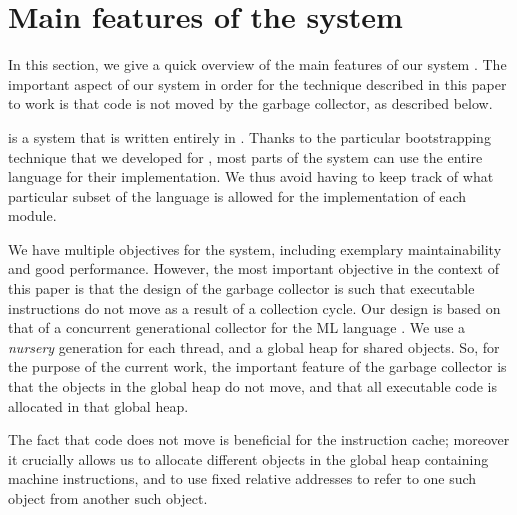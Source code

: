 \section{Main features of the \sicl{} system}
\label{sec-sicl-features}

In this section, we give a quick overview of the main features of our
system \sicl{}.  The important aspect of our system in order for the
technique described in this paper to work is that code is not moved by
the garbage collector, as described below.

\sicl{} is a system that is written entirely in \commonlisp{}.  Thanks
to the particular bootstrapping technique
\cite{durand_irene_2019_2634314} that we developed for \sicl{}, most
parts of the system can use the entire language for their
implementation.  We thus avoid having to keep track of what particular
subset of the language is allowed for the implementation of each
module.

We have multiple objectives for the \sicl{} system, including
exemplary maintainability and good performance.  However, the most
important objective in the context of this paper is that the design of
the garbage collector is such that executable instructions do not move
as a result of a collection cycle.  Our design is based on that of a
concurrent generational collector for the ML language
\cite{Doligez:1993:CGG}.  We use a \emph{nursery} generation for each
thread, and a global heap for shared objects.  So, for the purpose of
the current work, the important feature of the garbage collector is
that the objects in the global heap do not move, and that all
executable code is allocated in that global heap.

The fact that code does not move is beneficial for the instruction
cache; moreover it crucially allows us to allocate different objects
in the global heap containing machine instructions, and to use fixed
relative addresses to refer to one such object from another such
object.
